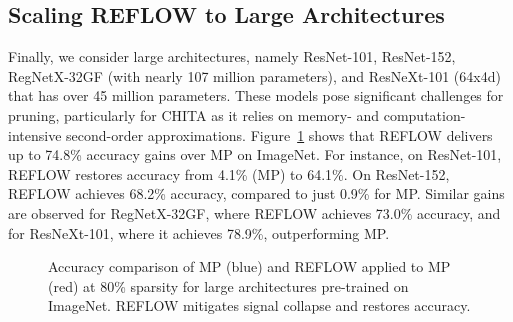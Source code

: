 \subsection{Scaling REFLOW to Large Architectures}
Finally, we consider large architectures, namely ResNet-101, ResNet-152, RegNetX-32GF (with nearly 107 million parameters), and ResNeXt-101 (64x4d) that has over 45 million parameters. These models pose significant challenges for pruning, particularly for CHITA as it relies on memory- and computation-intensive second-order approximations.
Figure~\ref{fig:large_architectures} shows that REFLOW delivers up to 74.8\% accuracy gains over MP on ImageNet. For instance, on ResNet-101, REFLOW restores accuracy from 4.1\% (MP) to 64.1\%. On ResNet-152, REFLOW achieves 68.2\% accuracy, compared to just 0.9\% for MP. Similar gains are observed for RegNetX-32GF, where REFLOW achieves 73.0\% accuracy, and for ResNeXt-101, where it achieves 78.9\%, outperforming MP. 

\begin{figure}[h]
    \centering
    \caption{Accuracy comparison of MP (blue) and REFLOW applied to MP (red) at 80\% sparsity for large architectures pre-trained on ImageNet. REFLOW mitigates signal collapse and restores accuracy.}
    \label{fig:large_architectures}
\end{figure}



